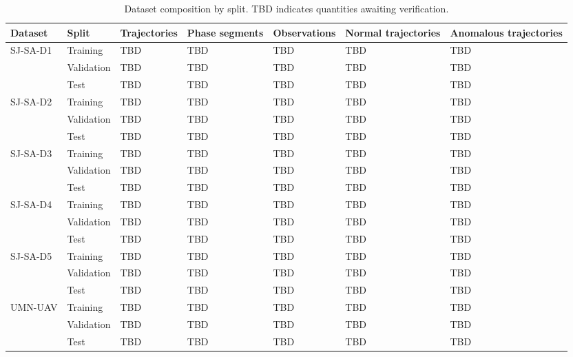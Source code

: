 \documentclass[iicol,pdflatex,sn-basic,Numbered]{sn-jnl}%
\theoremstyle{thmstyleone}%
\theoremstyle{thmstyletwo}%
\theoremstyle{thmstylethree}%
\begin{document}
\begin{table}[!t]
\centering
\caption{Dataset composition by split. TBD indicates quantities awaiting verification.}
\label{tab:dataset_split_statistics}
\setlength{\tabcolsep}{5pt}
\tablebodyfont
\begin{tabularx}{\textwidth}{@{}l l *{5}{>{\centering\arraybackslash}X}@{}}
\toprule
Dataset & Split & Trajectories & Phase segments & Observations & Normal trajectories & Anomalous trajectories \\
\midrule
\multirow{3}{*}{SJ-SA-D1} & Training   & TBD & TBD & TBD & TBD & TBD \\
                          & Validation & TBD & TBD & TBD & TBD & TBD \\
                          & Test       & TBD & TBD & TBD & TBD & TBD \\
\midrule
\multirow{3}{*}{SJ-SA-D2} & Training   & TBD & TBD & TBD & TBD & TBD \\
                          & Validation & TBD & TBD & TBD & TBD & TBD \\
                          & Test       & TBD & TBD & TBD & TBD & TBD \\
\midrule
\multirow{3}{*}{SJ-SA-D3} & Training   & TBD & TBD & TBD & TBD & TBD \\
                          & Validation & TBD & TBD & TBD & TBD & TBD \\
                          & Test       & TBD & TBD & TBD & TBD & TBD \\
\midrule
\multirow{3}{*}{SJ-SA-D4} & Training   & TBD & TBD & TBD & TBD & TBD \\
                          & Validation & TBD & TBD & TBD & TBD & TBD \\
                          & Test       & TBD & TBD & TBD & TBD & TBD \\
\midrule
\multirow{3}{*}{SJ-SA-D5} & Training   & TBD & TBD & TBD & TBD & TBD \\
                          & Validation & TBD & TBD & TBD & TBD & TBD \\
                          & Test       & TBD & TBD & TBD & TBD & TBD \\
\midrule
\multirow{3}{*}{UMN-UAV}  & Training   & TBD & TBD & TBD & TBD & TBD \\
                          & Validation & TBD & TBD & TBD & TBD & TBD \\
                          & Test       & TBD & TBD & TBD & TBD & TBD \\
\bottomrule
\end{tabularx}
\end{table}
\end{document}
